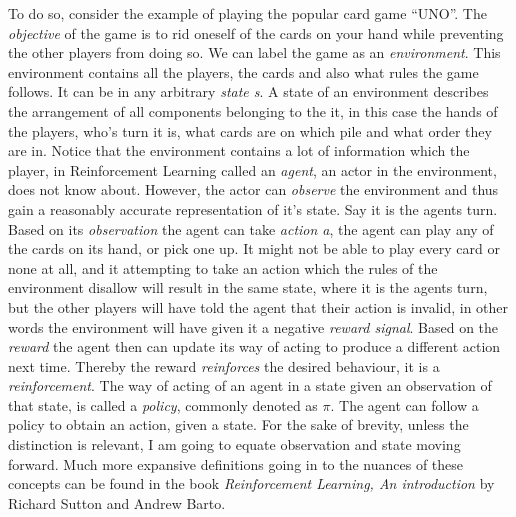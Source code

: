 \noindent
To do so, consider the example of playing the popular card game “UNO”. The \textit{objective} of the game is to rid oneself of the cards on your hand while preventing the other players from doing so. We can label the game as an \textit{environment}. This environment contains all the players, the cards and also what rules the game follows. It  can be in any arbitrary \textit{state s}. A state of an environment describes the arrangement of all components belonging to the it, in this case the hands of the players, who's turn it is, what cards are on which pile and what order they are in. Notice that the environment contains a lot of information which the player, in Reinforcement Learning called an \textit{agent}, an actor in the environment, does not know about. However, the actor can \textit{observe} the environment and thus gain a reasonably accurate representation of it’s state. Say it is the agents turn. Based on its \textit{observation} the agent can take \textit{action a}, the agent can play any of the cards on its hand, or pick one up. It might not be able to play every card or none at all, and it attempting to take an action which the rules of the environment disallow will result in the same state, where it is the agents turn, but the other players will have told the agent that their action is invalid, in other words the environment will have given it a negative \textit{reward signal}. Based on the \textit{reward} the agent then can update its way of acting to produce a different action next time. Thereby the reward \textit{reinforces} the desired behaviour, it is a \textit{reinforcement}. The way of acting of an agent in a state given an observation of that state, is called a \textit{policy}, commonly denoted as $\pi$. The agent can follow a policy to obtain an action, given a state.
\newline
For the sake of brevity, unless the distinction is relevant, I am going to equate observation and state moving forward. Much more expansive definitions going in to the nuances of these concepts can be found in the book \textit{Reinforcement Learning, An introduction} by Richard Sutton and Andrew Barto. \cite{sutton_reinforcement_2018}

